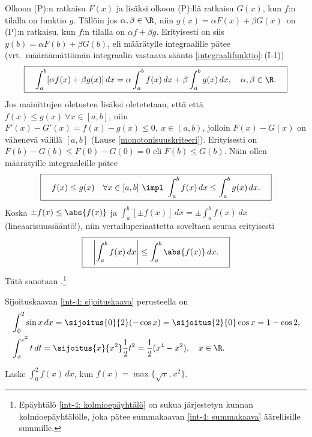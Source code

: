 Olkoon (P):n ratkaisu $F(x)$ ja lisäksi olkoon (P):llä ratkaisu $G(x)$, kun $f$:n tilalla on
funktio $g$. Tällöin jos $\alpha,\beta\in\R$, niin $y(x)=\alpha F(x)+\beta G(x)\,$ on
(P):n ratkaisu, kun $f$:n tilalla on $\alpha f +\beta g$. Erityisesti on siis
$y(b)=\alpha F(b)+\beta G(b)$, eli määrätylle integraalille pätee 
(vrt.\ määräämättömän integraalin vastaava sääntö \ref{integraalifunktio}:\,(I-1))
%
\begin{equation} \label{int-4: lineaarisuussääntö}
\boxed{\quad \int_a^b [\alpha f(x)+\beta g(x)]\, dx 
        = \alpha\int_a^b f(x)\, dx + \beta\int_a^b g(x)\, dx, \quad \alpha,\beta\in\R. \quad}
\end{equation}
Jos mainittujen oletusten lisäksi oletetetaan, että että $f(x) \le g(x)\ \forall x\in[a,b]$,
niin $F'(x)-G'(x) = f(x)-g(x) \le 0,\ x\in(a,b)$, jolloin $F(x)-G(x)$ on vähenevä välillä
$[a,b]$ (Lause \ref{monotonisuuskriteeri}). Erityisesti on $F(b)-G(b) \le F(0)-G(0) = 0$ eli
$F(b) \le G(b)$. Näin ollen määrätyille integraaleille pätee 
%
\begin{equation} \label{int-4: vertailuperiaate}
\boxed{\quad f(x)\leq g(x)\quad\forall x\in [a,b] 
             \ \impl \ \int_a^b f(x)\,dx \le \int_a^b g(x)\,dx. \quad}
\end{equation}
Koska $\pm f(x) \le \abs{f(x)}$ ja $\int_a^b [\pm f(x)]\,dx = \pm\int_a^b f(x)\,dx$
(lineaarisuussääntö!), niin vertailuperiaattetta soveltaen seuraa erityisesti
\begin{equation} \label{int-4: kolmioepäyhtälö}
\boxed{\quad \left|\int_a^b f(x)\, dx\right|\leq \int_a^b\abs{f(x)}\,dx. \quad}
\end{equation}
Tätä sanotaan 
%
.\footnote[2]{Epäyhtälö
\eqref{int-4: kolmioepäyhtälö} on sukua järjestetyn kunnan kolmioepäyhtälölle, joka pätee
summakaavan \eqref{int-4: summakaava} äärellisille summille.}
\begin{Exa} Sijoituskaavan \eqref{int-4: sijoituskaava} perusteella on
\begin{align*}
&\int_0^2 \sin x\, dx=\sijoitus{0}{2}(-\cos x)=\sijoitus{2}{0}\cos x=1-\cos 2, \\
&\int_x^{x^2} t\, dt =\sijoitus{x}{x^2}\frac{1}{2}t^2=\frac{1}{2}(x^4-x^2), \quad x\in\R.
\end{align*}
\end{Exa}
\begin{Exa} Laske $\int_0^2 f(x)\,dx$, kun $f(x)=\max\{\sqrt{x},x^2\}$. \end{Exa}
